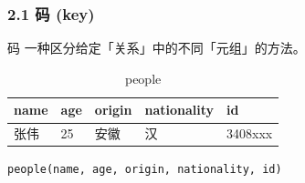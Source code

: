 \documentclass[aspectratio=169, 14pt]{beamer}
\begin{document}
\begin{frame}
	\frametitle{2.1 码 (key)}
	\begin{exampleblock}{码}
		一种区分给定「关系」中的不同「元组」的方法。
	\end{exampleblock}

	\begin{table}
		\caption*{people}
		\begin{tabular}{lllll}
			\toprule
			name & age & origin & nationality & id      \\
			\midrule
			张伟   & 25  & 安徽     & 汉           & 3408xxx \\
			\bottomrule
		\end{tabular}
	\end{table}
	\texttt{people(name, age, origin, nationality, id)}
\end{frame}
\end{document}
